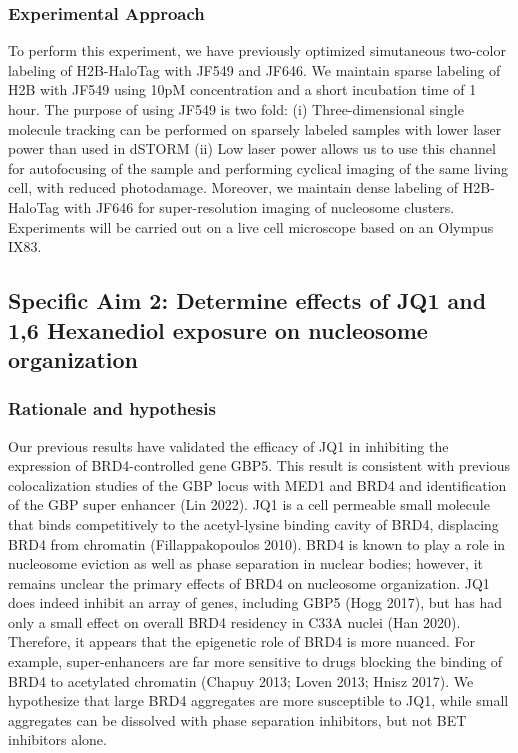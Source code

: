 \documentclass{ucetd}
\begin{document}
\subsubsection{Experimental Approach}

To perform this experiment, we have previously optimized simutaneous two-color labeling of H2B-HaloTag with JF549 and JF646. We maintain sparse labeling of H2B with JF549 using 10pM concentration and a short incubation time of 1 hour. The purpose of using JF549 is two fold: (i) Three-dimensional single molecule tracking can be performed on sparsely labeled samples with lower laser power than used in dSTORM (ii) Low laser power allows us to use this channel for autofocusing of the sample and performing cyclical imaging of the same living cell, with reduced photodamage. Moreover, we maintain dense labeling of H2B-HaloTag with JF646 for super-resolution imaging of nucleosome clusters. Experiments will be carried out on a live cell microscope based on an Olympus IX83.


\subsection{Specific Aim 2: Determine effects of JQ1 and 1,6 Hexanediol exposure on nucleosome organization}

\subsubsection{Rationale and hypothesis}

Our previous results have validated the efficacy of JQ1 in inhibiting the expression of BRD4-controlled gene GBP5. This result is consistent with previous colocalization studies of the GBP locus with MED1 and BRD4 and identification of the GBP super enhancer (Lin 2022). JQ1 is a cell permeable small molecule that binds competitively to the acetyl-lysine binding cavity of BRD4, displacing BRD4 from chromatin (Fillappakopoulos 2010). BRD4 is known to play a role in nucleosome eviction as well as phase separation in nuclear bodies; however, it remains unclear the primary effects of BRD4 on nucleosome organization. JQ1 does indeed inhibit an array of genes, including GBP5 (Hogg 2017), but has had only a small effect on overall BRD4 residency in C33A nuclei (Han 2020). Therefore, it appears that the epigenetic role of BRD4 is more nuanced. For example, super-enhancers are far more sensitive to drugs blocking the binding of BRD4 to acetylated chromatin (Chapuy 2013; Loven 2013; Hnisz 2017). We hypothesize that large BRD4 aggregates are more susceptible to JQ1, while small aggregates can be dissolved with phase separation inhibitors, but not BET inhibitors alone.
\end{document}
